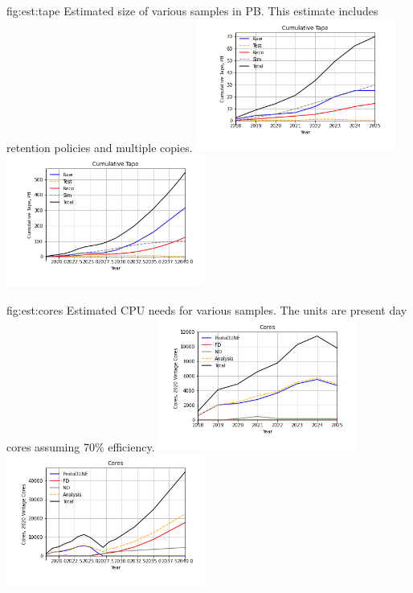 \documentclass[../main-v1.tex]{subfiles}
\begin{document}
\begin{dunefigure}
{fig:est:tape}
{Estimated size of various samples in PB. This estimate includes retention policies and multiple copies.}
\includegraphics[width=0.49\textwidth]{graphics/IntroFigures/soon/Cumulative-Tape.png}
\includegraphics[width=0.49\textwidth]{graphics/IntroFigures/2040/Cumulative-Tape.png}

\end{dunefigure}

\begin{dunefigure}
{fig:est:cores}
{Estimated CPU needs for  various samples.  The units are present day cores assuming 70\% efficiency.}
\includegraphics[width=0.49\textwidth]{graphics/IntroFigures/soon/Cores.png}
\includegraphics[width=0.49\textwidth]{graphics/IntroFigures/2040/Cores.png}
\end{dunefigure}
\end{document}
